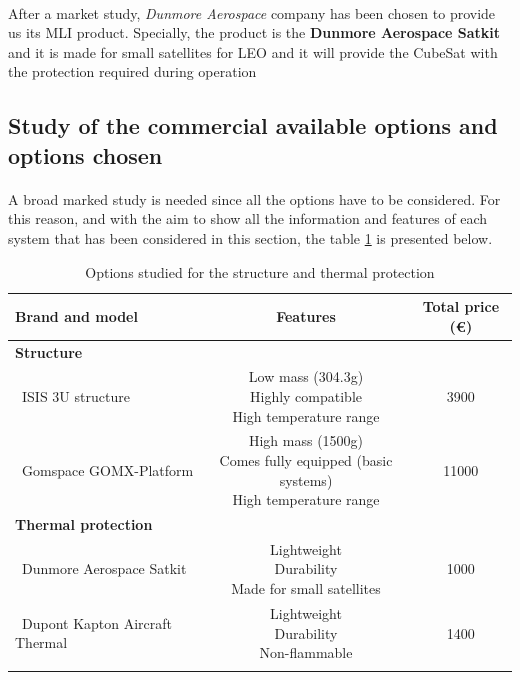 \paragraph{} 
After a market study, \textit{Dunmore Aerospace} company has been chosen to provide us its MLI product. Specially, the product is the \textbf{Dunmore Aerospace Satkit} and it is made for small satellites for LEO and it will provide the CubeSat with the protection required during operation

\subsection{Study of the commercial available options and options chosen}
\paragraph{}A broad marked study is needed since all the options have to be considered. For this reason, and with the aim to show all the information and features of each system that has been considered in this section, the table \ref{structureoptions} is presented below.


\begin{longtable}{| l | c | c | }
\hline
\rowcolor[gray]{0.80}	\textbf{Brand and model} &  \textbf{Features}     & \textbf{Total price (\euro)}   \\
\hline
\endfirsthead

\rowcolor[gray]{0.85} \textbf{Structure} &  &  \\
	   ~ISIS 3U structure & \makecell{Low mass (304.3g) \\ Highly compatible \\ High temperature range} & 3900 \\
	   \hline
	   ~Gomspace GOMX-Platform & \makecell{High mass (1500g) \\ Comes fully equipped (basic systems) \\ High temperature range} & 11000 \\
	   \hline
\rowcolor[gray]{0.85} \textbf{Thermal protection} &  &  \\
	   ~Dunmore Aerospace Satkit & \makecell{Lightweight \\ Durability \\ Made for small satellites}& 1000 \\
	   \hline
	   ~Dupont Kapton Aircraft Thermal & \makecell{Lightweight \\ Durability \\ Non-flammable} & 1400 \\
	\hline

\caption{Options studied for the structure and thermal protection}
\label{structureoptions}
\end{longtable}


